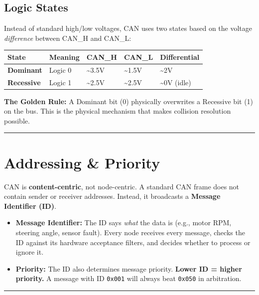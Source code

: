 \documentclass[12pt,a4paper,oneside]{report}
\providecommand{\tightlist}{\setlength{\itemsep}{0pt}\setlength{\parskip}{0pt}}
\begin{document}
\subsection{Logic States}\label{logic-states}

Instead of standard high/low voltages, CAN uses two states based on the voltage
\emph{difference} between CAN\_H and CAN\_L:

\begin{longtable}[]{@{}lllll@{}}
\toprule\noalign{}
State & Meaning & CAN\_H & CAN\_L & Differential \\
\midrule\noalign{}
\endhead
\bottomrule\noalign{}
\endlastfoot
\textbf{Dominant} & Logic 0 & \textasciitilde3.5V & \textasciitilde1.5V &
\textasciitilde2V \\
\textbf{Recessive} & Logic 1 & \textasciitilde2.5V & \textasciitilde2.5V &
\textasciitilde0V (idle) \\
\end{longtable}

\textbf{The Golden Rule:} A Dominant bit (0) physically overwrites a Recessive
bit (1) on the bus. This is the physical mechanism that makes collision
resolution possible.

\begin{center}\rule{0.5\linewidth}{0.5pt}\end{center}

\section{Addressing \& Priority}\label{addressing-priority}

CAN is \textbf{content-centric}, not node-centric. A standard CAN frame does not
contain sender or receiver addresses. Instead, it broadcasts a \textbf{Message
Identifier (ID)}.

\begin{itemize}
\tightlist
\item
  \textbf{Message Identifier:} The ID says \emph{what} the data is (e.g., motor
  RPM, steering angle, sensor fault). Every node receives every message, checks
  the ID against its hardware acceptance filters, and decides whether to process
  or ignore it.
\item
  \textbf{Priority:} The ID also determines message priority. \textbf{Lower ID =
  higher priority.} A message with ID \texttt{0x001} will always beat
  \texttt{0x050} in arbitration.
\end{itemize}

\begin{center}\rule{0.5\linewidth}{0.5pt}\end{center}
\end{document}
